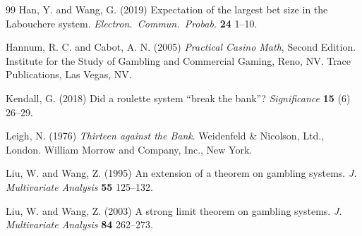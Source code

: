 \documentclass{article}
\theoremstyle{definition}
\theoremstyle{remark}
\begin{document}
\begin{thebibliography}{99}
 Han, Y. and Wang, G. (2019) Expectation of the largest bet size in the Labouchere system.  \textit{Electron.\ Commun.\ Probab.} \textbf{24} 1--10. 

 Hannum, R. C. and Cabot, A. N. (2005) \textit{Practical Casino Math}, Second Edition.  Institute for the Study of Gambling and Commercial Gaming, Reno, NV.  Trace Publications, Las Vegas, NV.

 Kendall, G. (2018) Did a roulette system ``break the bank''? \textit{Significance} \textbf{15} (6) 26--29.

 Leigh, N. (1976) \textit{Thirteen against the Bank}.  Weidenfeld \& Nicolson, Ltd., London.  William Morrow and Company, Inc., New York. 

 Liu, W. and Wang, Z. (1995) An extension of a theorem on gambling systems.  \textit{J. Multivariate Analysis} \textbf{55} 125--132.

 Liu, W. and Wang, Z. (2003) A strong limit theorem on gambling systems.  \textit{J. Multivariate Analysis} \textbf{84} 262--273.

\end{thebibliography}
\end{document}
